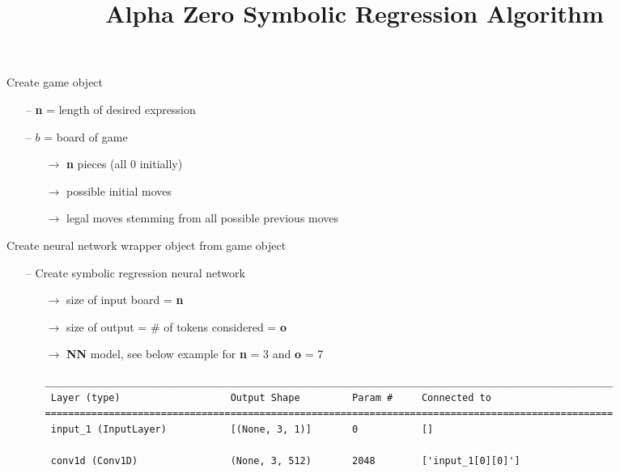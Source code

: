 \documentclass[12pt]{article}
\title{Alpha Zero Symbolic Regression Algorithm}
\begin{document}
\maketitle
\newpage

\begin{redenum}
    \item Create game object
    \begin{itemize}
	\item[--] \textbf{n} = length of desired expression 
	\item[--] $b$ = board of game
	\begin{itemize}
		\item[$\rightarrow$] \textbf{n} pieces (all 0 initially)
		\item[$\rightarrow$] possible initial moves
		\item[$\rightarrow$] legal moves stemming from all possible previous moves
	 \end{itemize}
    \end{itemize}
    \item Create neural network wrapper object from game object
    \begin{itemize}
	\item[--] Create symbolic regression neural network
	\begin{itemize}
		\item[$\rightarrow$] size of input board = \textbf{n}
		\item[$\rightarrow$] size of output = \# of tokens considered = \textbf{o}
		\item[$\rightarrow$] \textbf{NN} model, see below example for \textbf{n} = 3 and \textbf{o} = 7
		\begin{center}
  
\tiny
			\begin{BVerbatim}
__________________________________________________________________________________________________
 Layer (type)                   Output Shape         Param #     Connected to                     
==================================================================================================
 input_1 (InputLayer)           [(None, 3, 1)]       0           []                               
                                                                                                  
 conv1d (Conv1D)                (None, 3, 512)       2048        ['input_1[0][0]']                
                                                                                                  

\end{BVerbatim}
\end{center}
\end{itemize}
\end{itemize}
\end{redenum}
\end{document}
